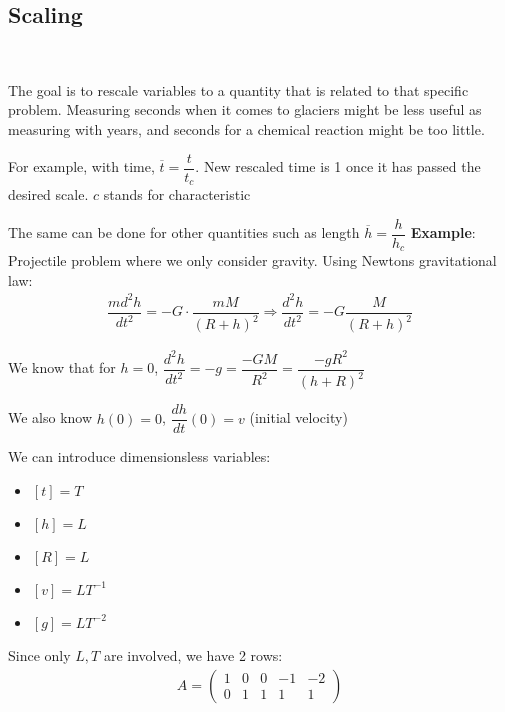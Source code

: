 \subsection{Scaling}\hfill\\
\par\bigskip
\noindent The goal is to rescale variables to a quantity that is related to that specific problem. Measuring seconds when it comes to glaciers might be less useful as measuring with years, and seconds for a chemical reaction might be too little. 
\par\bigskip
\noindent For example, with time, $\overline{t} = \dfrac{t}{t_c}$. New rescaled time is 1 once it has passed the desired scale. $c$ stands for characteristic\par
\noindent The same can be done for other quantities such as length $\overline{h} = \dfrac{h}{h_c}$ 
\newpage
\noindent\textbf{Example}:
\noindent Projectile problem where we only consider gravity. Using Newtons gravitational law:
\begin{equation*}
  \begin{gathered}
    \dfrac{md^2h}{dt^2} = -G\cdot\dfrac{mM}{(R+h)^2} \Rightarrow \dfrac{d^2h}{dt^2} = -G\dfrac{M}{(R+h)^2}
  \end{gathered}
\end{equation*}\par
\noindent We know that for $h = 0$, $\dfrac{d^2h}{dt^2} = -g = \dfrac{-GM}{R^2} = \dfrac{-gR^2}{(h+R)^2}$\par
\noindent We also know $h(0) = 0$, $\dfrac{dh}{dt}(0) = v$ (initial velocity)
\par\bigskip
\noindent We can introduce dimensionsless variables:\par
\begin{itemize}
  \item $[t] = T$
  \item $[h] = L$
  \item $[R] = L$
  \item $[v] = LT^{-1}$
  \item $[g] = LT^{-2}$
\end{itemize}\par
\noindent Since only $L,T$ are involved, we have 2 rows:
\begin{equation*}
  \begin{gathered}
    A = \begin{pmatrix}1&0&0&-1&-2\\0&1&1&1&1\end{pmatrix}
  \end{gathered}
\end{equation*}\par
